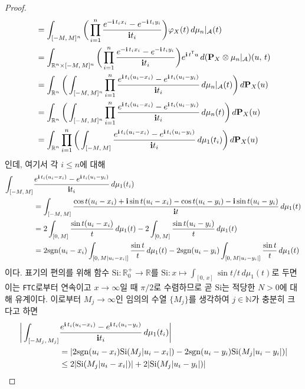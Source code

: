 \begin{proof}
\begin{align*}
        &=\int_{[-M,\,M]^n}\bigg(\prod_{i=1}^n\frac{e^{-\mathbf{i}\,t_ix_i}-e^{-\mathbf{i}\,t_iy_i}}{\mathbf{i} t_i}\bigg)\varphi_X(t)\,d\mu_n\vert_\mathcal{A}(t)\\
        &=\int_{\mathbb{R}^n\times[-M,\,M]^n}\bigg(\prod_{i=1}^n\frac{e^{-\mathbf{i}\,t_ix_i}-e^{-\mathbf{i}\,t_iy_i}}{\mathbf{i} t_i}\bigg)e^{\mathbf{i}\,t^{\mathsf{T}} u}\,d(\mathbf{P}_X\otimes\mu_n\vert_\mathcal{A})(u,\,t)\\
        &=\int_{\mathbb{R}^n}\bigg(\int_{[-M,\,M]^n}\prod_{i=1}^n\frac{e^{\mathbf{i}\,t_i(u_i-x_i)}-e^{\mathbf{i}\,t_i(u_i-y_i)}}{\mathbf{i} t_i}\,d\mu_n\vert_\mathcal{A}(t)\bigg)\,d\mathbf{P}_X(u)\\
        &=\int_{\mathbb{R}^n}\bigg(\int_{[-M,\,M]^n}\prod_{i=1}^n\frac{e^{\mathbf{i}\,t_i(u_i-x_i)}-e^{\mathbf{i}\,t_i(u_i-y_i)}}{\mathbf{i} t_i}\,d\mu_n(t)\bigg)\,d\mathbf{P}_X(u)\\
        &=\int_{\mathbb{R}^n}\prod_{i=1}^n\bigg(\int_{[-M,\,M]}\frac{e^{\mathbf{i}\,t_i(u_i-x_i)}-e^{\mathbf{i}\,t_i(u_i-y_i)}}{\mathbf{i} t_i}\,d\mu_1(t_i)\bigg)\,d\mathbf{P}_X(u)
    \end{align*}
    인데, 여기서 각 $i\leq n$에 대해
    \begin{align*}
        \int_{[-M,\,M]}&\frac{e^{\mathbf{i}\,t_i(u_i-x_i)}-e^{\mathbf{i}\,t_i(u_i-y_i)}}{\mathbf{i} t_i}\,d\mu_1(t_i)\\
        &=\int_{[-M,\,M]}\frac{\cos t(u_i-x_i)+\mathbf{i}\sin t(u_i-x_i)-\cos t(u_i-y_i)-\mathbf{i}\sin t(u_i-y_i)}{\mathbf{i} t}\,d\mu_1(t)\\
        &=2\int_{[0,\,M]}\frac{\sin t(u_i-x_i)}{t}\,d\mu_1(t)-2\int_{[0,\,M]}\frac{\sin t(u_i-y_i)}{t}\,d\mu_1(t)\\
        &=2\mathrm{sgn}(u_i-x_i)\int_{[0,\,M|u_i-x_i|]}\frac{\sin t}{t}\,d\mu_1(t)-2\mathrm{sgn}(u_i-y_i)\int_{[0,\,M|u_i-y_i|]}\frac{\sin t}{t}\,d\mu_1(t)
    \end{align*}
    이다. 표기의 편의를 위해 함수 $\mathrm{Si}:\mathbb{R}^+_0\to\mathbb{R}$를 $\mathrm{Si}:x\mapsto\int_{[0,\,x]}\sin t/t\,d\mu_1(t)$로 두면 이는 \texttt{FTC}로부터 연속이고 $x\to\infty$일 때 $\pi/2$로 수렴하므로 곧 $\mathrm{Si}$는 적당한 $N>0$에 대해 유계이다. 이로부터 $M_j\to\infty$인 임의의 수열 $\{M_j\}$를 생각하여 $j\in\mathbb{N}$가 충분히 크다고 하면
    \begin{align*}
        \bigg|\int_{[-M_j,\,M_j]}&\frac{e^{\imag\,t_i(u_i-x_i)}-e^{\imag\,t_i(u_i-y_i)}}{\imag t_i}\,d\mu_1(t_i)\bigg|\\
        &=|2\sgn(u_i-x_i)\mathrm{Si}(M_j|u_i-x_i|)-2\sgn(u_i-y_i)\mathrm{Si}(M_j|u_i-y_i|)|\\
        &\leq2|\mathrm{Si}(M_j|u_i-x_i|)|+2|\mathrm{Si}(M_j|u_i-y_i|)|\\

\end{align*}
\end{proof}
